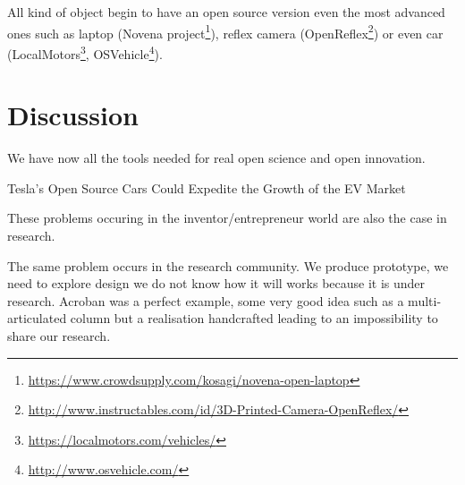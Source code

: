 All kind of object begin to have an open source version even the most advanced ones such as laptop (Novena project\footnote{\url{https://www.crowdsupply.com/kosagi/novena-open-laptop}}), reflex camera (OpenReflex\footnote{\url{http://www.instructables.com/id/3D-Printed-Camera-OpenReflex/}}) or even car (LocalMotors\footnote{\url{https://localmotors.com/vehicles/}}, OSVehicle\footnote{\url{http://www.osvehicle.com/}}).






\section{Discussion} %

We have now all the tools needed for real open science and open innovation.

Tesla's Open Source Cars Could Expedite the Growth of the EV Market

These problems occuring in the inventor/entrepreneur world are also the case in research.

The same problem occurs in the research community.
We produce prototype, we need to explore design we do not know how it will works because it is under research.
Acroban was a perfect example, some very good idea such as a multi-articulated column but a realisation handcrafted leading to an impossibility to share our research.
